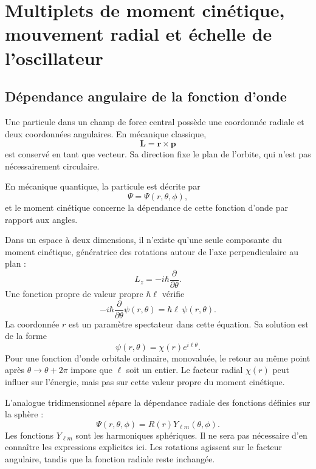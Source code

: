 \chapter{Multiplets de moment cinétique, mouvement radial et échelle de l’oscillateur}

\section{Dépendance angulaire de la fonction d’onde}

Une particule dans un champ de force central possède une coordonnée radiale et deux coordonnées angulaires. En mécanique classique,
\begin{equation}
\mathbf L=\mathbf r\times\mathbf p
\end{equation}
est conservé en tant que vecteur. Sa direction fixe le plan de l’orbite, qui n’est pas nécessairement circulaire.

En mécanique quantique, la particule est décrite par
\begin{equation}
\Psi=\Psi(r,\theta,\phi),
\end{equation}
et le moment cinétique concerne la dépendance de cette fonction d’onde par rapport aux angles.

Dans un espace à deux dimensions, il n’existe qu’une seule composante du moment cinétique, génératrice des rotations autour de l’axe perpendiculaire au plan :
\begin{equation}
L_z=-i\hbar\frac{\partial}{\partial\theta}.
\end{equation}
Une fonction propre de valeur propre \(\hbar\ell\) vérifie
\begin{equation}
-i\hbar\frac{\partial}{\partial\theta}\psi(r,\theta)
=\hbar\ell\,\psi(r,\theta).
\end{equation}
La coordonnée \(r\) est un paramètre spectateur dans cette équation. Sa solution est de la forme
\begin{equation}
\psi(r,\theta)=\chi(r)e^{i\ell\theta}.
\end{equation}
Pour une fonction d’onde orbitale ordinaire, monovaluée, le retour au même point après \(\theta\to\theta+2\pi\) impose que \(\ell\) soit un entier. Le facteur radial \(\chi(r)\) peut influer sur l’énergie, mais pas sur cette valeur propre du moment cinétique.

L’analogue tridimensionnel sépare la dépendance radiale des fonctions définies sur la sphère :
\begin{equation}
\Psi(r,\theta,\phi)=R(r)Y_{\ell m}(\theta,\phi).
\end{equation}
Les fonctions \(Y_{\ell m}\) sont les harmoniques sphériques. Il ne sera pas nécessaire d’en connaître les expressions explicites ici. Les rotations agissent sur le facteur angulaire, tandis que la fonction radiale reste inchangée.

